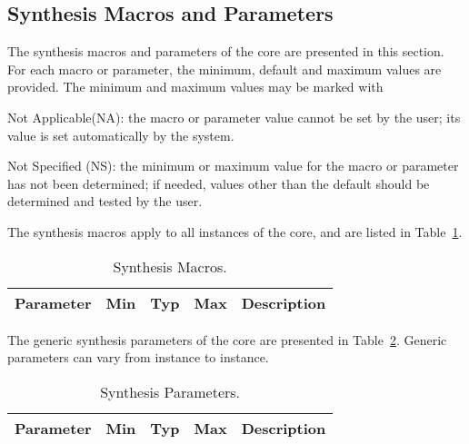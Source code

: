 \subsection{Synthesis Macros and Parameters}
\label{sec:smp}

\ifdefined\SMP
The synthesis macros and parameters of the core are presented in this section.
For each macro or parameter, the minimum, default and maximum values are
provided. The minimum and maximum values may be marked with

\begin{description}
\item{Not Applicable(NA)}:  the macro or parameter value cannot be set by the user; its value is set automatically by the system.
\item{Not Specified (NS)}:  the minimum or maximum value for the macro or parameter has not been determined; if needed, values other than the default should be determined and tested by the user. 
\end{description}


\ifdefined\SMK

The synthesis macros apply to all instances of the core, and are listed in
Table~\ref{tab:sm}.

\begin{table}[h]
  \centering
    \begin{tabularx}{\textwidth}{ | c | c | c | c | X | }
    \hline
    \rowcolor{iob-green}
    {\bf Parameter} & {\bf Min} & {\bf Typ} & {\bf Max} & {\bf Description} \\\hline

    

    \end{tabularx}
  \caption{Synthesis Macros.}
  \label{tab:sm}
\end{table}
\fi


\ifdefined\SPK

The generic synthesis parameters of the core are presented in
Table~\ref{tab:sp}. Generic parameters can vary from instance to instance.

\begin{table}[h]
  \centering
    \begin{tabularx}{\textwidth}{ | c | c | c | c | X | }
    \hline
    \rowcolor{iob-green}
    {\bf Parameter} & {\bf Min} & {\bf Typ} & {\bf Max} & {\bf Description} \\\hline

    

    \end{tabularx}
  \caption{Synthesis Parameters.}
  \label{tab:sp}
\end{table}
\fi
\fi


